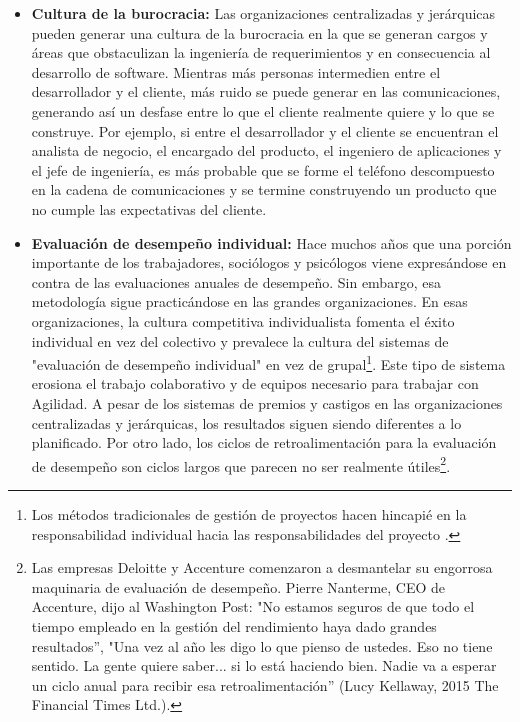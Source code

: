 \begin{itemize}
\item \textbf{Cultura de la burocracia: } 
Las organizaciones centralizadas y jerárquicas pueden generar una cultura de la burocracia en la que se generan cargos y áreas que obstaculizan la ingeniería de requerimientos y en consecuencia al desarrollo de software. Mientras más personas intermedien entre el desarrollador y el cliente, más ruido se puede generar en las comunicaciones, generando así un desfase entre lo que el cliente realmente quiere y lo que se construye. Por ejemplo, si entre el desarrollador y el cliente se encuentran el analista de negocio, el encargado del producto, el ingeniero de aplicaciones y el jefe de ingeniería, es más probable que se forme el teléfono descompuesto en la cadena de comunicaciones y se termine construyendo un producto que no cumple las expectativas del cliente.

\item \textbf{Evaluación de desempeño individual: } 
Hace muchos años que una porción importante de los trabajadores, sociólogos y psicólogos viene expresándose en contra de las evaluaciones anuales de desempeño. Sin embargo, esa metodología sigue practicándose en las grandes organizaciones. En esas organizaciones, la cultura competitiva individualista fomenta el éxito individual en vez del colectivo y prevalece la cultura del sistemas de "evaluación de desempeño individual" en vez de grupal\footnote{Los métodos tradicionales de gestión de proyectos hacen hincapié en la responsabilidad individual hacia las responsabilidades del proyecto \cite{SBOK-2013}.}. Este tipo de sistema erosiona el trabajo colaborativo y de equipos necesario para trabajar con Agilidad. A pesar de los sistemas de premios y castigos en las organizaciones centralizadas y jerárquicas, los resultados siguen siendo diferentes a lo planificado. Por otro lado, los ciclos de retroalimentación para la evaluación de desempeño son ciclos largos que parecen no ser realmente útiles\footnote{Las empresas Deloitte y Accenture  comenzaron a desmantelar su engorrosa maquinaria de evaluación de desempeño. Pierre Nanterme, CEO de Accenture, dijo al Washington Post: "No estamos seguros de que todo el tiempo empleado en la gestión del rendimiento haya dado grandes resultados”, "Una vez al año les digo lo que pienso de ustedes. Eso no tiene sentido. La gente quiere saber... si lo está haciendo bien. Nadie va a esperar un ciclo anual para recibir esa retroalimentación” (Lucy Kellaway, 2015 The Financial Times Ltd.).}.

\end{itemize}

